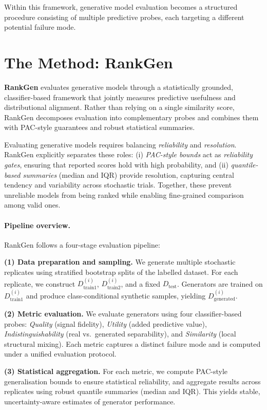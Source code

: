 Within this framework, generative model evaluation becomes a structured
procedure consisting of multiple predictive probes, each targeting a
different potential failure mode.

\section{The Method: RankGen}
\label{sec:method}

\textbf{RankGen} evaluates generative models through a statistically grounded,
classifier-based framework that jointly measures predictive usefulness and
distributional alignment. Rather than relying on a single similarity score,
RankGen decomposes evaluation into complementary probes and combines them
with PAC-style guarantees and robust statistical summaries.

Evaluating generative models requires balancing \emph{reliability} and
\emph{resolution}. RankGen explicitly separates these roles:
(i) \emph{PAC-style bounds} act as \emph{reliability gates}, ensuring that
reported scores hold with high probability, and
(ii) \emph{quantile-based summaries} (median and IQR) provide resolution,
capturing central tendency and variability across stochastic trials.
Together, these prevent unreliable models from being ranked while enabling
fine-grained comparison among valid ones.

\paragraph{Pipeline overview.}
RankGen follows a four-stage evaluation pipeline:

\textbf{(1) Data preparation and sampling.}
We generate multiple stochastic replicates using stratified bootstrap splits of
the labelled dataset. For each replicate, we construct
$D_{\text{train1}}^{(i)}$, $D_{\text{train2}}^{(i)}$, and a fixed
$D_{\text{test}}$. Generators are trained on
$D_{\text{train1}}^{(i)}$ and produce class-conditional synthetic samples,
yielding $D_{\text{generated}}^{(i)}$.

\textbf{(2) Metric evaluation.}
We evaluate generators using four classifier-based probes:
\emph{Quality} (signal fidelity),
\emph{Utility} (added predictive value),
\emph{Indistinguishability} (real vs.\ generated separability), and
\emph{Similarity} (local structural mixing).
Each metric captures a distinct failure mode and is computed under a unified
evaluation protocol.

\textbf{(3) Statistical aggregation.}
For each metric, we compute PAC-style generalisation bounds to ensure
statistical reliability, and aggregate results across replicates using robust
quantile summaries (median and IQR). This yields stable, uncertainty-aware
estimates of generator performance.

